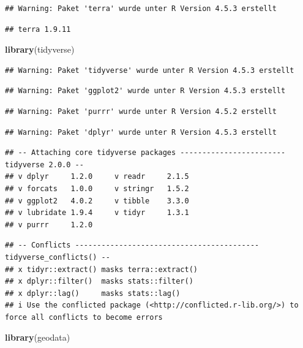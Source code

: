 \documentclass[
]{article}
\newenvironment{Shaded}{\begin{snugshade}}{\end{snugshade}}
\newcommand{\FunctionTok}[1]{\textcolor[rgb]{0.13,0.29,0.53}{\textbf{#1}}}
\newcommand{\NormalTok}[1]{#1}
\begin{document}
\begin{verbatim}
## Warning: Paket 'terra' wurde unter R Version 4.5.3 erstellt
\end{verbatim}

\begin{verbatim}
## terra 1.9.11
\end{verbatim}

\begin{Shaded}
\begin{Highlighting}[]
\FunctionTok{library}\NormalTok{(tidyverse)}
\end{Highlighting}
\end{Shaded}

\begin{verbatim}
## Warning: Paket 'tidyverse' wurde unter R Version 4.5.3 erstellt
\end{verbatim}

\begin{verbatim}
## Warning: Paket 'ggplot2' wurde unter R Version 4.5.3 erstellt
\end{verbatim}

\begin{verbatim}
## Warning: Paket 'purrr' wurde unter R Version 4.5.2 erstellt
\end{verbatim}

\begin{verbatim}
## Warning: Paket 'dplyr' wurde unter R Version 4.5.3 erstellt
\end{verbatim}

\begin{verbatim}
## -- Attaching core tidyverse packages ------------------------ tidyverse 2.0.0 --
## v dplyr     1.2.0     v readr     2.1.5
## v forcats   1.0.0     v stringr   1.5.2
## v ggplot2   4.0.2     v tibble    3.3.0
## v lubridate 1.9.4     v tidyr     1.3.1
## v purrr     1.2.0
\end{verbatim}

\begin{verbatim}
## -- Conflicts ------------------------------------------ tidyverse_conflicts() --
## x tidyr::extract() masks terra::extract()
## x dplyr::filter()  masks stats::filter()
## x dplyr::lag()     masks stats::lag()
## i Use the conflicted package (<http://conflicted.r-lib.org/>) to force all conflicts to become errors
\end{verbatim}

\begin{Shaded}
\begin{Highlighting}[]
\FunctionTok{library}\NormalTok{(geodata)}
\end{Highlighting}
\end{Shaded}
\end{document}
